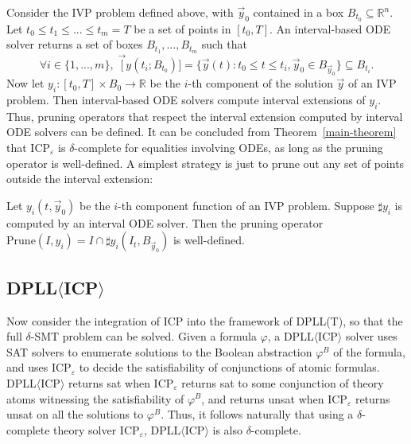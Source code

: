 \documentclass[envcountsect]{llncs}
\begin{document}
Consider the IVP problem defined above, with $\vec y_0$ contained in a box $B_{t_0}\subseteq \mathbb{R}^n$. Let $t_0\leq t_1\leq ...\leq t_m = T$ be a set of points in $[t_0, T]$. An interval-based ODE solver returns a set of boxes $B_{t_1},...,B_{t_m}$ such that 
$$\forall i\in \{1,...,m\},\; \vec [y(t_i; B_{t_0})] = \{\vec y(t): t_0\leq t\leq t_i, \vec y_0\in B_{\vec y_0}\}\subseteq B_{t_i}.$$
Now let $y_i: [t_0, T]\times B_0 \rightarrow \mathbb{R}$ be the $i$-th component of the solution $\vec y$ of an IVP problem. Then interval-based ODE solvers compute interval extensions of $y_i$. 
Thus, pruning operators that respect the interval extension computed by interval ODE solvers can be defined. It can be concluded from Theorem~\ref{main-theorem} that ICP$_{\varepsilon}$ is $\delta$-complete for equalities involving ODEs, as long as the pruning operator is well-defined. A simplest strategy is just to prune out any set of points outside the interval extension:
\begin{proposition}
Let $y_i(t,\vec y_0)$ be the $i$-th component function of an IVP problem. Suppose $\sharp y_i$ is computed by an interval ODE solver. Then the pruning operator $\mathrm{Prune}(I, y_i) = I\cap \sharp y_i(I_t, B_{\vec y_0})$ is well-defined. 
\end{proposition}
\subsection{DPLL$\langle$ICP$\rangle$}
Now consider the integration of ICP into the framework of DPLL(T), so that the full $\delta$-SMT problem can be solved. Given a formula $\varphi$, a DPLL$\langle$ICP$\rangle$ solver uses SAT solvers to enumerate solutions to the Boolean abstraction $\varphi^B$ of the formula, and uses ICP$_{\varepsilon}$ to decide the satisfiability of conjunctions of atomic formulas. %
DPLL$\langle$ICP$\rangle$ returns {\sf sat} when ICP$_{\varepsilon}$ returns {\sf sat} to some conjunction of theory atoms witnessing the satisfiability of $\varphi^B$, and returns {\sf unsat} when ICP$_{\varepsilon}$ returns {\sf unsat} on all the solutions to $\varphi^B$. Thus, it follows naturally that using a $\delta$-complete theory solver ICP$_{\varepsilon}$, DPLL$\langle$ICP$\rangle$ is also $\delta$-complete. 
\end{document}
